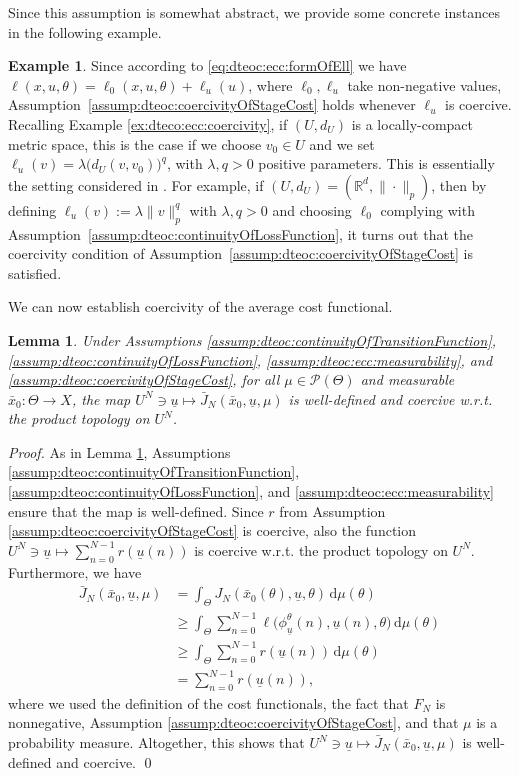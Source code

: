 \documentclass[letterpaper, 10 pt, conference]{IEEEconf}  %
\newcommand{\R}{\mathbb{R}} %
\newcommand{\Pbs}{\mathcal{P}} %
\newcommand{\diff}{\, \mathrm{d}} %
\newcommand{\s}{\phi} %
\newcommand{\es}{\bar{x}} %
\newcommand{\is}[1]{{\underline{#1}}} %
\theoremstyle{theorem}
\newtheorem{lemma}[theorem]{Lemma}
\theoremstyle{definition}
\newtheorem{example}{Example}
\theoremstyle{remark}
\begin{document}
Since this assumption is somewhat abstract, we provide some concrete instances in the following example.
\begin{example}
    Since according to \eqref{eq:dteoc:ecc:formOfEll} we have $\ell(x,u,\theta)= \ell_0(x,u,\theta) + \ell_u(u)$, where $\ell_0, \ell_u$ take non-negative values,
    Assumption~\ref{assump:dteoc:coercivityOfStageCost} holds whenever $\ell_u$ is coercive.
    Recalling Example \ref{ex:dteco:ecc:coercivity}, if $(U,d_U)$ is a locally-compact metric space, this is the case if we choose $v_0 \in U$ and we set $\ell_u(v) = \lambda \big(d_U(v,v_0)\big)^q$, with $\lambda,q>0$ positive parameters. 
    This is essentially the setting considered in \cite{scagliotti2023optimal}.
    For example, if $(U,d_U)=(\R^d, \|\cdot \|_p)$, then by defining $\ell_u(v) :=  \lambda \|v\|_p^q$ with $\lambda, q>0$ and choosing $\ell_0$ complying with Assumption~\ref{assump:dteoc:continuityOfLossFunction}, it turns out that the coercivity condition of Assumption~\ref{assump:dteoc:coercivityOfStageCost} is satisfied.
\end{example}
We can now establish coercivity of the average cost functional.
\begin{lemma} \label{lem:dteoc:coercivityOfCostFunctional}
Under Assumptions \ref{assump:dteoc:continuityOfTransitionFunction}, \ref{assump:dteoc:continuityOfLossFunction}, \ref{assump:dteoc:ecc:measurability}, and \ref{assump:dteoc:coercivityOfStageCost}, for all $\mu\in\Pbs(\Theta)$ and measurable $\es_0 \colon \Theta\rightarrow X$,
the map $U^N \ni \is{u} \mapsto \bar J_N(\es_0,\is{u},\mu)$ is well-defined and coercive w.r.t. the product topology on $U^N$.
\end{lemma}
\begin{proof}
As in Lemma \ref{lem:dteoc:coercivityOfCostFunctional}, Assumptions \ref{assump:dteoc:continuityOfTransitionFunction}, \ref{assump:dteoc:continuityOfLossFunction}, and  \ref{assump:dteoc:ecc:measurability} ensure that the map is well-defined.
Since $r$ from Assumption \ref{assump:dteoc:coercivityOfStageCost} is coercive, also the function $U^N \ni \is{u} \mapsto \sum_{n=0}^{N-1} r(\is{u}(n))$ is coercive w.r.t. the product topology on $U^N$.
Furthermore, we have
\begin{align*}
    \bar J_N(\es_0, \is{u}, \mu) & = \int_\Theta J_N(\es_0(\theta),\is{u},\theta) \diff \mu(\theta) \\
    & \geq \int_\Theta \sum_{n=0}^{N-1} \ell \big( \s_{\is{u}}^\theta(n), \is{u}(n), \theta \big) \diff \mu(\theta) \\
    & \geq \int_\Theta \sum_{n=0}^{N-1} r(\is{u}(n)) \diff \mu(\theta) \\
    & = \sum_{n=0}^{N-1} r(\is{u}(n)),
\end{align*}
where we used the definition of the cost functionals, the fact that $F_N$ is nonnegative, Assumption \ref{assump:dteoc:coercivityOfStageCost}, and that $\mu$ is a probability measure.
Altogether, this shows that $U^N \ni \is{u} \mapsto \bar J_N(\es_0,\is{u},\mu)$ is well-defined and coercive. \qed
\end{proof}
\end{document}
